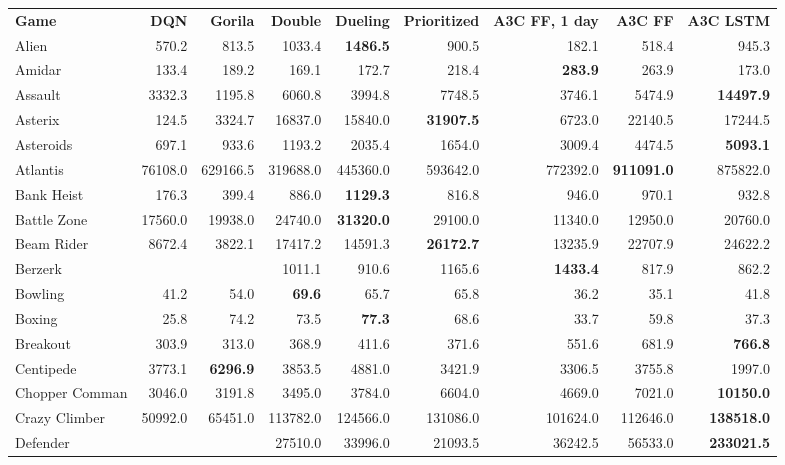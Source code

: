 \documentclass{article} %
\begin{document}
\begin{table}[h]
    \centering
    \begin{scriptsize}
    \begin{tabular}{lrrrrrrrr}
        \textbf{Game} & \textbf{DQN} & \textbf{Gorila} & \textbf{Double} & \textbf{Dueling} & \textbf{Prioritized} & \textbf{A3C FF, 1 day} & \textbf{A3C FF } & \textbf{A3C LSTM } \\
Alien & 570.2 & 813.5 & 1033.4 & \textbf{1486.5} & 900.5 & 182.1 & 518.4 & 945.3\\
Amidar & 133.4 & 189.2 & 169.1 & 172.7 & 218.4 & \textbf{283.9} & 263.9 & 173.0\\
Assault & 3332.3 & 1195.8 & 6060.8 & 3994.8 & 7748.5 & 3746.1 & 5474.9 & \textbf{14497.9}\\
Asterix & 124.5 & 3324.7 & 16837.0 & 15840.0 & \textbf{31907.5} & 6723.0 & 22140.5 & 17244.5\\
Asteroids & 697.1 & 933.6 & 1193.2 & 2035.4 & 1654.0 & 3009.4 & 4474.5 & \textbf{5093.1}\\
Atlantis & 76108.0 & 629166.5 & 319688.0 & 445360.0 & 593642.0 & 772392.0 & \textbf{911091.0} & 875822.0\\
Bank Heist & 176.3 & 399.4 & 886.0 & \textbf{1129.3} & 816.8 & 946.0 & 970.1 & 932.8\\
Battle Zone & 17560.0 & 19938.0 & 24740.0 & \textbf{31320.0} & 29100.0 & 11340.0 & 12950.0 & 20760.0\\
Beam Rider & 8672.4 & 3822.1 & 17417.2 & 14591.3 & \textbf{26172.7} & 13235.9 & 22707.9 & 24622.2\\
Berzerk &  &  & 1011.1 & 910.6 & 1165.6 & \textbf{1433.4} & 817.9 & 862.2\\
Bowling & 41.2 & 54.0 & \textbf{69.6} & 65.7 & 65.8 & 36.2 & 35.1 & 41.8\\
Boxing & 25.8 & 74.2 & 73.5 & \textbf{77.3} & 68.6 & 33.7 & 59.8 & 37.3\\
Breakout & 303.9 & 313.0 & 368.9 & 411.6 & 371.6 & 551.6 & 681.9 & \textbf{766.8}\\
Centipede & 3773.1 & \textbf{6296.9} & 3853.5 & 4881.0 & 3421.9 & 3306.5 & 3755.8 & 1997.0\\
Chopper Comman & 3046.0 & 3191.8 & 3495.0 & 3784.0 & 6604.0 & 4669.0 & 7021.0 & \textbf{10150.0}\\
Crazy Climber & 50992.0 & 65451.0 & 113782.0 & 124566.0 & 131086.0 & 101624.0 & 112646.0 & \textbf{138518.0}\\
Defender &  &  & 27510.0 & 33996.0 & 21093.5 & 36242.5 & 56533.0 & \textbf{233021.5}\\

\end{tabular}
\end{scriptsize}
\end{table}
\end{document}
